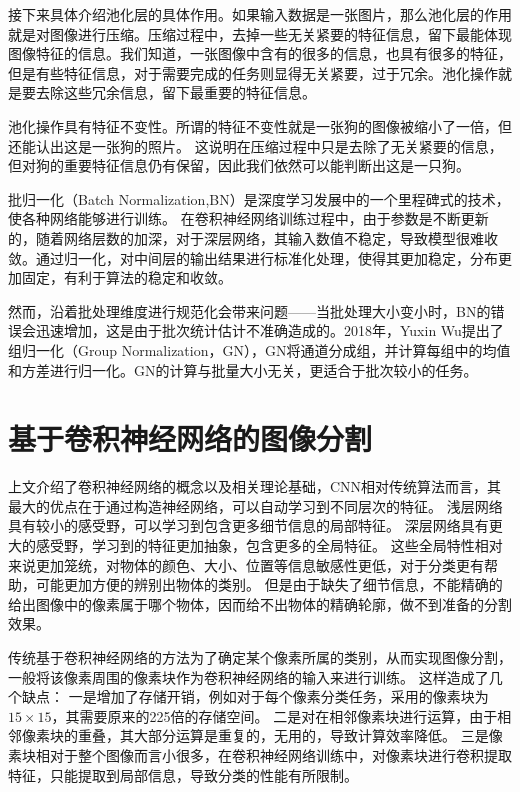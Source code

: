 接下来具体介绍池化层的具体作用。如果输入数据是一张图片，那么池化层的作用就是对图像进行压缩。压缩过程中，去掉一些无关紧要的特征信息，留下最能体现图像特征的信息。我们知道，一张图像中含有的很多的信息，也具有很多的特征，但是有些特征信息，对于需要完成的任务则显得无关紧要，过于冗余。池化操作就是要去除这些冗余信息，留下最重要的特征信息。

池化操作具有特征不变性。所谓的特征不变性就是一张狗的图像被缩小了一倍，但还能认出这是一张狗的照片。
这说明在压缩过程中只是去除了无关紧要的信息，但对狗的重要特征信息仍有保留，因此我们依然可以能判断出这是一只狗。

批归一化（Batch Normalization,BN）\cite{ioffe2015batch}是深度学习发展中的一个里程碑式的技术，使各种网络能够进行训练。
在卷积神经网络训练过程中，由于参数是不断更新的，随着网络层数的加深，对于深层网络，其输入数值不稳定，导致模型很难收敛。通过归一化，对中间层的输出结果进行标准化处理，使得其更加稳定，分布更加固定，有利于算法的稳定和收敛。

然而，沿着批处理维度进行规范化会带来问题——当批处理大小变小时，BN的错误会迅速增加，这是由于批次统计估计不准确造成的。2018年，Yuxin Wu提出了组归一化（Group Normalization，GN）\cite{wu2018group}，GN将通道分成组，并计算每组中的均值和方差进行归一化。GN的计算与批量大小无关，更适合于批次较小的任务。

\section{基于卷积神经网络的图像分割}
上文介绍了卷积神经网络的概念以及相关理论基础，CNN相对传统算法而言，其最大的优点在于通过构造神经网络，可以自动学习到不同层次的特征。
浅层网络具有较小的感受野，可以学习到包含更多细节信息的局部特征。
深层网络具有更大的感受野，学习到的特征更加抽象，包含更多的全局特征。
这些全局特性相对来说更加笼统，对物体的颜色、大小、位置等信息敏感性更低，对于分类更有帮助，可能更加方便的辨别出物体的类别。
但是由于缺失了细节信息，不能精确的给出图像中的像素属于哪个物体，因而给不出物体的精确轮廓，做不到准备的分割效果。

传统基于卷积神经网络的方法为了确定某个像素所属的类别，从而实现图像分割，一般将该像素周围的像素块作为卷积神经网络的输入来进行训练。
这样造成了几个缺点：
一是增加了存储开销，例如对于每个像素分类任务，采用的像素块为$15\times 15$，其需要原来的225倍的存储空间。
二是对在相邻像素块进行运算，由于相邻像素块的重叠，其大部分运算是重复的，无用的，导致计算效率降低。
三是像素块相对于整个图像而言小很多，在卷积神经网络训练中，对像素块进行卷积提取特征，只能提取到局部信息，导致分类的性能有所限制。

